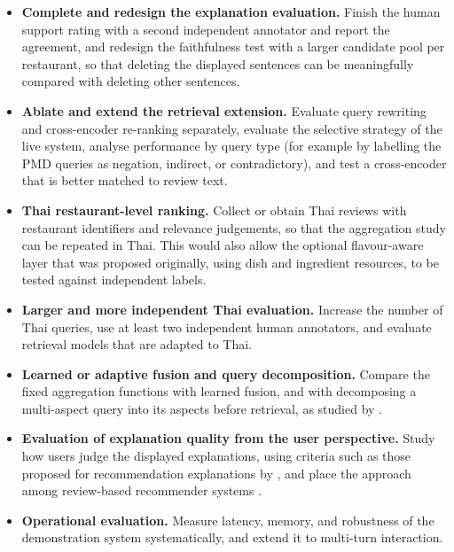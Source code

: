 \begin{itemize}
    \item \textbf{Complete and redesign the explanation evaluation.} Finish the human support rating with a second independent annotator and report the agreement, and redesign the faithfulness test with a larger candidate pool per restaurant, so that deleting the displayed sentences can be meaningfully compared with deleting other sentences.
    \item \textbf{Ablate and extend the retrieval extension.} Evaluate query rewriting and cross-encoder re-ranking separately, evaluate the selective strategy of the live system, analyse performance by query type (for example by labelling the PMD queries as negation, indirect, or contradictory), and test a cross-encoder that is better matched to review text.
    \item \textbf{Thai restaurant-level ranking.} Collect or obtain Thai reviews with restaurant identifiers and relevance judgements, so that the aggregation study can be repeated in Thai. This would also allow the optional flavour-aware layer that was proposed originally, using dish and ingredient resources, to be tested against independent labels.
    \item \textbf{Larger and more independent Thai evaluation.} Increase the number of Thai queries, use at least two independent human annotators, and evaluate retrieval models that are adapted to Thai.
    \item \textbf{Learned or adaptive fusion and query decomposition.} Compare the fixed aggregation functions with learned fusion, and with decomposing a multi-aspect query into its aspects before retrieval, as studied by \citet{korikov2024}.
    \item \textbf{Evaluation of explanation quality from the user perspective.} Study how users judge the displayed explanations, using criteria such as those proposed for recommendation explanations by \citet{zhang2025}, and place the approach among review-based recommender systems \citep{hasan2025}.
    \item \textbf{Operational evaluation.} Measure latency, memory, and robustness of the demonstration system systematically, and extend it to multi-turn interaction.
\end{itemize}

